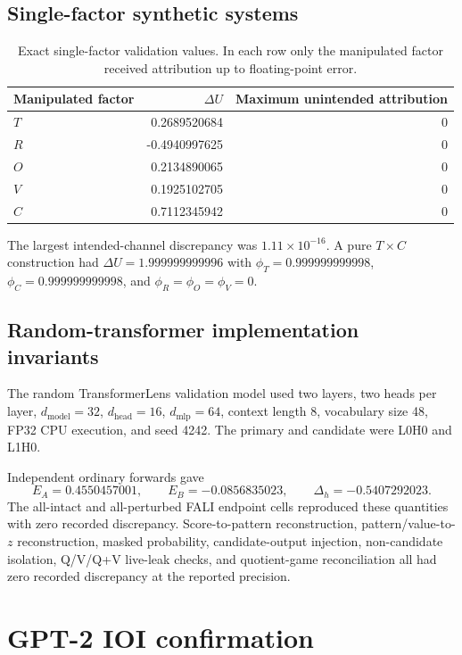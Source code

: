 \documentclass[preprint,12pt,authoryear]{elsarticle}
\begin{document}
\subsection{Single-factor synthetic systems}

\begin{table}[h]
\centering
\caption{Exact single-factor validation values. In each row only the manipulated
factor received attribution up to floating-point error.}
\begin{tabular}{lrr}
\toprule
Manipulated factor & $\Delta U$ & Maximum unintended attribution \\
\midrule
$T$ & 0.2689520684 & 0 \\
$R$ & -0.4940997625 & 0 \\
$O$ & 0.2134890065 & 0 \\
$V$ & 0.1925102705 & 0 \\
$C$ & 0.7112345942 & 0 \\
\bottomrule
\end{tabular}
\end{table}

The largest intended-channel discrepancy was
$1.11\times 10^{-16}$. A pure $T\times C$ construction had
$\Delta U=1.999999999996$ with
$\phi_T=0.999999999998$,
$\phi_C=0.999999999998$, and
$\phi_R=\phi_O=\phi_V=0$.

\subsection{Random-transformer implementation invariants}

The random TransformerLens validation model used two layers, two heads per layer,
$d_{\mathrm{model}}=32$, $d_{\mathrm{head}}=16$, $d_{\mathrm{mlp}}=64$,
context length 8, vocabulary size 48, FP32 CPU execution, and seed 4242.
The primary and candidate were L0H0 and L1H0.

Independent ordinary forwards gave
\[
E_A=0.4550457001,\qquad
E_B=-0.0856835023,\qquad
\Delta_h=-0.5407292023.
\]
The all-intact and all-perturbed FALI endpoint cells reproduced these quantities
with zero recorded discrepancy. Score-to-pattern reconstruction,
pattern/value-to-$z$ reconstruction, masked probability, candidate-output
injection, non-candidate isolation, Q/V/Q+V live-leak checks, and quotient-game
reconciliation all had zero recorded discrepancy at the reported precision.

\section{GPT-2 IOI confirmation}
\end{document}
